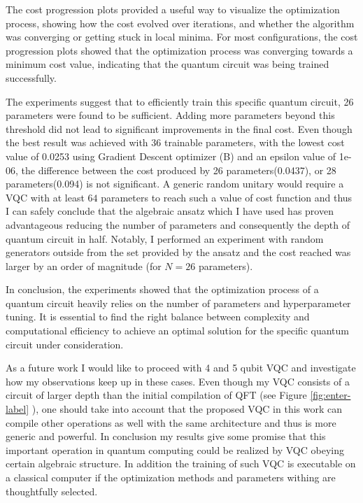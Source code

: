 \documentclass[inscr,ack,preface]{diphdthesis}
\begin{document}
The cost progression plots provided a useful way to visualize the optimization process, showing how the cost evolved over iterations, and whether the algorithm was converging or getting stuck in local minima. For most configurations, the cost progression plots showed that the optimization process was converging towards a minimum cost value, indicating that the quantum circuit was being trained successfully.

The experiments suggest that to efficiently train this specific quantum circuit, 26 parameters were found to be sufficient. Adding more parameters beyond this threshold did not lead to significant improvements in the final cost. Even though the best result was achieved with 36 trainable parameters, with the lowest cost value of 0.0253 using Gradient Descent optimizer (B) and an epsilon value of 1e-06, the difference between the cost produced by 26 parameters(0.0437), or 28 parameters(0.094) is not significant. A generic random unitary would require a VQC with at least $64$ parameters to reach such a value of cost function and thus I can safely conclude that the algebraic ansatz which I have used has proven advantageous reducing the number of parameters and consequently the depth of quantum circuit in half. Notably, I performed an experiment with random generators outside from the set provided by the ansatz and the cost reached was larger by an order of magnitude (for $N=26$ parameters).

In conclusion, the experiments showed that the optimization process of a quantum circuit heavily relies on the number of parameters and hyperparameter tuning. It is essential to find the right balance between complexity and computational efficiency to achieve an optimal solution for the specific quantum circuit under consideration.

As a future work I would like to proceed with 4 and 5 qubit VQC and investigate how my observations keep up in these cases. Even though my VQC consists of a circuit of larger  depth  than the initial compilation of QFT (see Figure \ref{fig:enter-label} ), one should take into account that the proposed VQC in this work can compile other operations as well with the same architecture and thus is more generic and powerful. In conclusion  my results give some promise that this important operation in quantum computing could be realized  by VQC obeying certain algebraic structure. In addition the training of such VQC is executable on a classical computer if the optimization methods and parameters withing are thoughtfully selected.
\end{document}
